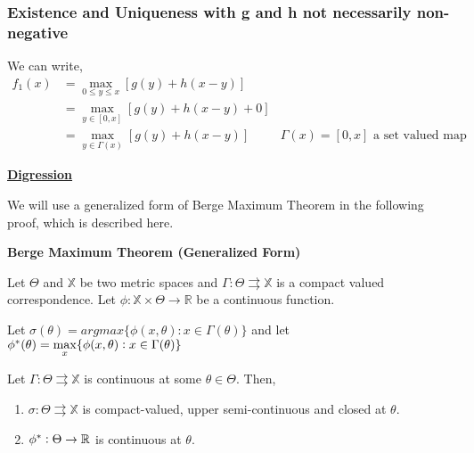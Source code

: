 \subsubsection{Existence and Uniqueness with g and h not necessarily non-negative}
We can write, 
\begin{align*}
    f_1(x) &= \max_{0 \le y \le x} [g(y) + h(x-y)] \\
            &= \max_{y \in [0, x]} [g(y) + h(x-y) + 0] \\
            &= \max_{y \in \Gamma(x)} [g(y) + h(x-y)] & \Gamma(x) = [0, x] \text { a set valued map}
\end{align*}

\begin{tcolorbox}
    \begin{center}
        \textbf{\underline{Digression}}
    \end{center}

    We will use a generalized form of Berge Maximum Theorem in the following proof, which is described here.

    \textbf{Berge Maximum Theorem (Generalized Form)}

    Let $\Theta$ and $\mathbb{X}$ be two metric spaces and $\Gamma: \Theta \rightrightarrows \mathbb{X}$ is a compact valued correspondence. Let $\phi: \mathbb{X} \times \Theta \rightarrow \mathbb{R}$ be a continuous function.

    Let $\sigma(\theta) = argmax\{\phi(x, \theta): x \in \Gamma(\theta)\}$ and let $\phi^*(\theta) = \mathlarger{\max}_x\{\phi(x, \theta): x \in \Gamma(\theta)\}$

    \vspace{3mm}
    Let $\Gamma: \Theta \rightrightarrows \mathbb{X}$ is continuous at some $\theta \in \Theta$. Then,
    \begin{enumerate}
        \item $\sigma: \Theta \rightrightarrows \mathbb{X}$ is compact-valued, upper semi-continuous and closed at $\theta$.
        \item $\phi^*: \Theta \rightarrow \mathbb{R}$ is continuous at $\theta$.
    \end{enumerate}


\end{tcolorbox}

